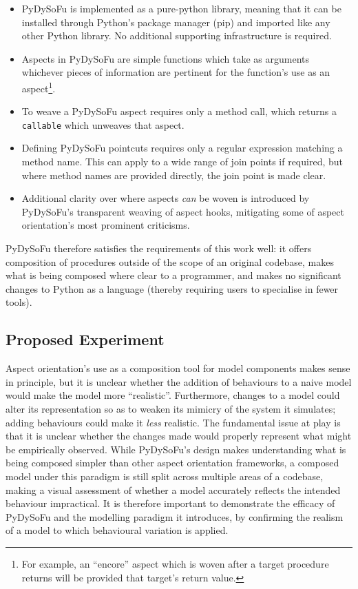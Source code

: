 \begin{itemize}
    \item PyDySoFu is implemented as a pure-python library, meaning that it can
    be installed through Python's package manager (pip) and imported like any
    other Python library. No additional supporting infrastructure is required.
    \item Aspects in PyDySoFu are simple functions which take as arguments
    whichever pieces of information are pertinent for the function's use as an
    aspect\footnote{For example, an ``encore'' aspect which is woven after a
    target procedure returns will be provided that target's return value.}.
    \item To weave a PyDySoFu aspect requires only a method call, which returns a
    \lstinline{callable} which unweaves that aspect.
    \item Defining PyDySoFu pointcuts requires only a regular expression
    matching a method name. This can apply to a wide range of join points if
    required, but where method names are provided directly, the join point is
    made clear.
    \item Additional clarity over where aspects \emph{can} be woven is
    introduced by PyDySoFu's transparent weaving of aspect hooks, mitigating
    some of aspect orientation's most prominent criticisms.
\end{itemize}

PyDySoFu therefore satisfies the requirements of this work well: it offers
composition of procedures outside of the scope of an original codebase, makes
what is being composed where clear to a programmer, and makes no significant
changes to Python as a language (thereby requiring users to specialise in fewer
tools). 


\subsection{Proposed Experiment}\label{subsec:optimisation_with_aspects_experiment}

Aspect orientation's use as a composition tool for model components makes sense
in principle, but it is unclear whether the addition of behaviours to a naive
model would make the model more ``realistic''. Furthermore, changes to a model
could alter its representation so as to weaken its mimicry of the system it
simulates; adding behaviours could make it \emph{less} realistic. The
fundamental issue at play is that it is unclear whether the changes made would
properly represent what might be empirically observed. While PyDySoFu's design
makes understanding what is being composed simpler than other aspect orientation
frameworks, a composed model under this paradigm is still split across multiple
areas of a codebase, making a visual assessment of whether a model accurately
reflects the intended behaviour impractical. It is therefore important to
demonstrate the efficacy of PyDySoFu and the modelling paradigm it introduces,
by confirming the realism of a model to which behavioural variation is applied.

